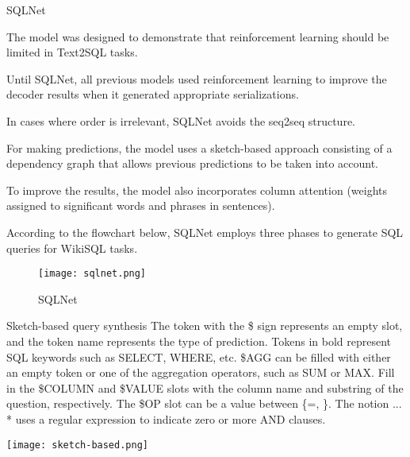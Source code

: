 SQLNet

\item The model was designed to demonstrate that reinforcement learning should be limited in Text2SQL tasks.
\item Until SQLNet, all previous models used reinforcement learning to improve the decoder results when it generated appropriate serializations.
\item In cases where order is irrelevant, SQLNet avoids the seq2seq structure.
\item For making predictions, the model uses a sketch-based approach consisting of a dependency graph that allows previous predictions to be taken into account.
\item To improve the results, the model also incorporates column attention (weights assigned to significant words and phrases in sentences).
\item According to the flowchart below, SQLNet employs three phases to generate SQL queries for WikiSQL tasks.

\begin{figure}[htb]
\centering
\texttt{[image: sqlnet.png]}
\caption{SQLNet}
\label{fig:sqlnet}
\end{figure}

Sketch-based query synthesis
The token with the \$ sign represents an empty slot, and the token name represents the type of prediction. Tokens in bold represent SQL keywords such as SELECT, WHERE, etc.
\$AGG can be filled with either an empty token or one of the aggregation operators, such as SUM or MAX. Fill in the \$COLUMN and \$VALUE slots with the column name and substring of the question, respectively. The \$OP slot can be a value between \{=, \}. The notion \(...\)* uses a regular expression to indicate zero or more AND clauses.

\texttt{[image: sketch-based.png]}